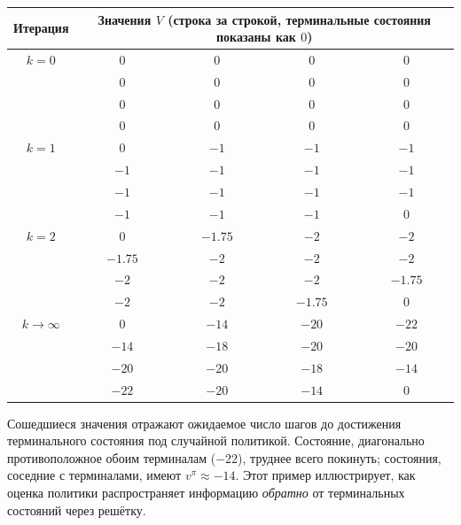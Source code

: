 \begin{example}
\begin{center}
\begin{tabular}{ccccc}
\toprule
Итерация & \multicolumn{4}{c}{Значения $V$ (строка за строкой, терминальные состояния показаны как $0$)} \\
\midrule
$k=0$ & $0$ & $0$ & $0$ & $0$ \\
      & $0$ & $0$ & $0$ & $0$ \\
      & $0$ & $0$ & $0$ & $0$ \\
      & $0$ & $0$ & $0$ & $0$ \\
\midrule
$k=1$ & $0$ & $-1$ & $-1$ & $-1$ \\
      & $-1$ & $-1$ & $-1$ & $-1$ \\
      & $-1$ & $-1$ & $-1$ & $-1$ \\
      & $-1$ & $-1$ & $-1$ & $0$ \\
\midrule
$k=2$ & $0$ & $-1.75$ & $-2$ & $-2$ \\
      & $-1.75$ & $-2$ & $-2$ & $-2$ \\
      & $-2$ & $-2$ & $-2$ & $-1.75$ \\
      & $-2$ & $-2$ & $-1.75$ & $0$ \\
\midrule
$k \to \infty$ & $0$ & $-14$ & $-20$ & $-22$ \\
               & $-14$ & $-18$ & $-20$ & $-20$ \\
               & $-20$ & $-20$ & $-18$ & $-14$ \\
               & $-22$ & $-20$ & $-14$ & $0$ \\
\bottomrule
\end{tabular}
\end{center}

\medskip
\noindent
Сошедшиеся значения отражают ожидаемое число шагов до достижения терминального состояния под случайной политикой.  Состояние, диагонально противоположное обоим терминалам ($-22$), труднее всего покинуть; состояния, соседние с терминалами, имеют $v^\pi \approx -14$.  Этот пример иллюстрирует, как оценка политики распространяет информацию \emph{обратно} от терминальных состояний через решётку.
\end{example}

